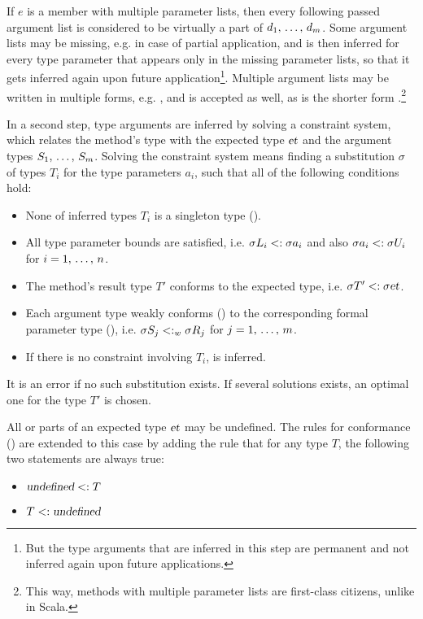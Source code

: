 If $e$ is a member with multiple parameter lists, then every following passed argument list is considered to be virtually a part of $d_1 ,\, \ldots ,\, d_m$. Some argument lists may be missing, e.g. in case of partial application, and  is then inferred for every type parameter that appears only in the missing parameter lists, so that it gets inferred again upon future application\footnote{But the type arguments that are inferred in this step are permanent and not inferred again upon future applications.}. Multiple argument lists may be written in multiple forms, e.g. , and  is accepted as well, as is the shorter form .\footnote{This way, methods with multiple parameter lists are first-class citizens, unlike in Scala.}

In a second step, type arguments are inferred by solving a constraint system, which relates the method's type with the expected type $\mbox{\sl et}$ and the argument types $S_1 ,\, \ldots ,\, S_m$. Solving the constraint system means finding a substitution $\sigma$ of types $T_i$ for the type parameters $a_i$, such that all of the following conditions hold:
\begin{itemize}
  \item None of inferred types $T_i$ is a singleton type (). %
  \item All type parameter bounds are satisfied, i.e. $\sigma L_i <: \sigma a_i$ and also $\sigma a_i <: \sigma U_i$ for $i = 1 ,\, \ldots ,\, n$. 
  \item The method's result type $T'$ conforms to the expected type, i.e. $\sigma T' <: \sigma \mbox{\sl et}$. 
  \item Each argument type weakly conforms () to the corresponding formal parameter type (), i.e. $\sigma S_j <: _w \sigma R_j$ for $j = 1 ,\, \ldots ,\, m$. 
  \item If there is no constraint involving $T_i$,  is inferred. 
\end{itemize}

It is an error if no such substitution exists. If several solutions exists, an optimal one for the type $T'$ is chosen. 

All or parts of an expected type $\mbox{\sl et}$ may be undefined. The rules for conformance () are extended to this case by adding the rule that for any type $T$, the following two statements are always true:
\begin{itemize}
  \item $\mbox{\sl undefined} <: T$
  \item $T <: \mbox{\sl undefined}$
\end{itemize}

